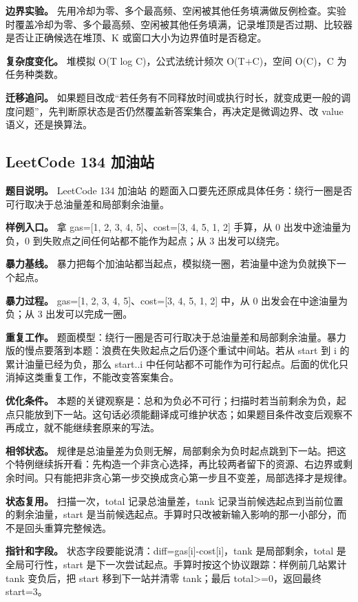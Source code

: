 \textbf{边界实验。} 先用冷却为零、多个最高频、空闲被其他任务填满做反例检查。实验时覆盖冷却为零、多个最高频、空闲被其他任务填满，记录堆顶是否过期、比较器是否让正确候选在堆顶、K 或窗口大小为边界值时是否稳定。

\textbf{复杂度变化。} 堆模拟 O(T log C)，公式法统计频次 O(T+C)，空间 O(C)，C 为任务种类数。

\textbf{迁移追问。} 如果题目改成“若任务有不同释放时间或执行时长，就变成更一般的调度问题”，先判断原状态是否仍然覆盖新答案集合，再决定是微调边界、改 value 语义，还是换算法。

\subsection{LeetCode 134 加油站}

\textbf{题目说明。} LeetCode 134 加油站 的题面入口要先还原成具体任务：绕行一圈是否可行取决于总油量差和局部剩余油量。

\textbf{样例入口。} 拿 gas=[1, 2, 3, 4, 5]、cost=[3, 4, 5, 1, 2] 手算，从 0 出发中途油量为负，0 到失败点之间任何站都不能作为起点；从 3 出发可以绕完。

\textbf{暴力基线。} 暴力把每个加油站都当起点，模拟绕一圈，若油量中途为负就换下一个起点。

\textbf{暴力过程。} gas=[1, 2, 3, 4, 5]、cost=[3, 4, 5, 1, 2] 中，从 0 出发会在中途油量为负；从 3 出发可以完成一圈。

\textbf{重复工作。} 题面模型：绕行一圈是否可行取决于总油量差和局部剩余油量。暴力版的慢点要落到本题：浪费在失败起点之后仍逐个重试中间站。若从 start 到 i 的累计油量已经为负，那么 start..i 中任何站都不可能作为可行起点。后面的优化只消掉这类重复工作，不能改变答案集合。

\textbf{优化条件。} 本题的关键观察是：总和为负必不可行；扫描时若当前剩余为负，起点只能放到下一站。这句话必须能翻译成可维护状态；如果题目条件改变后观察不再成立，就不能继续套原来的写法。

\textbf{相邻状态。} 规律是总油量差为负则无解，局部剩余为负时起点跳到下一站。把这个特例继续拆开看：先构造一个非贪心选择，再比较两者留下的资源、右边界或剩余时间。只有能把非贪心第一步交换成贪心第一步且不变差，局部选择才是规律。

\textbf{状态复用。} 扫描一次，total 记录总油量差，tank 记录当前候选起点到当前位置的剩余油量，start 是当前候选起点。手算时只改被新输入影响的那一小部分，而不是回头重算完整候选。

\textbf{指针和字段。} 状态字段要能说清：diff=gas[i]-cost[i]，tank 是局部剩余，total 是全局可行性，start 是下一次尝试起点。手算时按这个协议跟踪：样例前几站累计 tank 变负后，把 start 移到下一站并清零 tank；最后 total>=0，返回最终 start=3。

